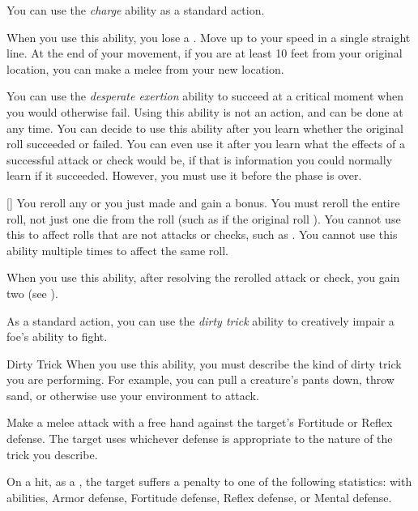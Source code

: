          You can use the \textit{charge} ability as a standard action.

        \begin{freeability}{}
            When you use this ability, you lose a .
            Move up to your speed in a single straight line.
            At the end of your movement, if you are at least 10 feet from your original location, you can make a melee  from your new location.
        \end{freeability}

         You can use the \textit{desperate exertion} ability to succeed at a critical moment when you would otherwise fail.
        Using this ability is not an action, and can be done at any time.
        You can decide to use this ability after you learn whether the original roll succeeded or failed.
        You can even use it after you learn what the effects of a successful attack or check would be, if that is information you could normally learn if it succeeded.
        However, you must use it before the phase is over.

        \begin{freeability}{}[]
            You reroll any  or  you just made and gain a  bonus.
            You must reroll the entire roll, not just one die from the roll (such as if the original roll ).
            You cannot use this to affect rolls that are not attacks or checks, such as .
            You cannot use this ability multiple times to affect the same roll.

            When you use this ability, after resolving the rerolled attack or check, you gain two  (see ).
        \end{freeability}

         As a standard action, you can use the \textit{dirty trick} ability to creatively impair a foe's ability to fight.

        \begin{freeability}{Dirty Trick}\label{Dirty Trick}
            When you use this ability, you must describe the kind of dirty trick you are performing.
            For example, you can pull a creature's pants down, throw sand, or otherwise use your environment to attack.

            Make a melee attack with a free hand against the target's Fortitude or Reflex defense.
            The target uses whichever defense is appropriate to the nature of the trick you describe.

            On a hit, as a , the target suffers a  penalty to one of the following statistics:
             with  abilities, Armor defense, Fortitude defense, Reflex defense, or Mental defense.
        \end{freeability}

